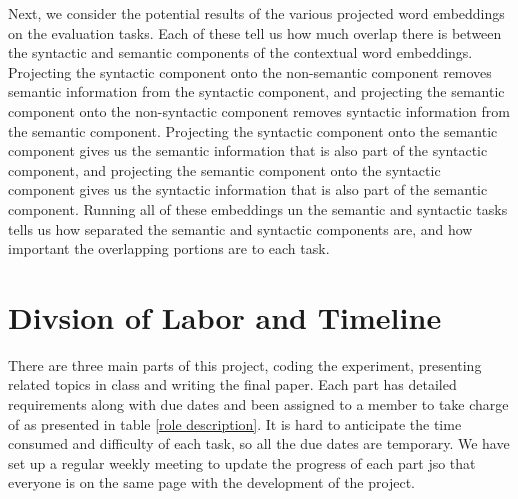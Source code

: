 \documentclass[11pt,a4paper]{article}
\begin{document}
Next, we consider the potential results of the various projected word embeddings on the evaluation tasks. Each of these tell us how much overlap there is between the syntactic and semantic components of the contextual word embeddings. Projecting the syntactic component onto the non-semantic component removes semantic information from the syntactic component, and projecting the semantic component onto the non-syntactic component removes syntactic information from the semantic component. Projecting the syntactic component onto the semantic component gives us the semantic information that is also part of the syntactic component, and projecting the semantic component onto the syntactic component gives us the syntactic information that is also part of the semantic component. Running all of these embeddings un the semantic and syntactic tasks tells us how separated the semantic and syntactic components are, and how important the overlapping portions are to each task.




\section{Divsion of Labor and Timeline}
\label{sec:management}
There are three main parts of this project, coding the experiment, presenting related topics in class and writing the final paper. Each part has detailed requirements along with due dates and been assigned to a member to take charge of as presented in table \ref{role description}. It is hard to anticipate the time consumed and difficulty of each task, so all the due dates are temporary. We have set up a regular weekly meeting to update the progress of each part jso that everyone is on the same page with the development of the project. 
\end{document}
